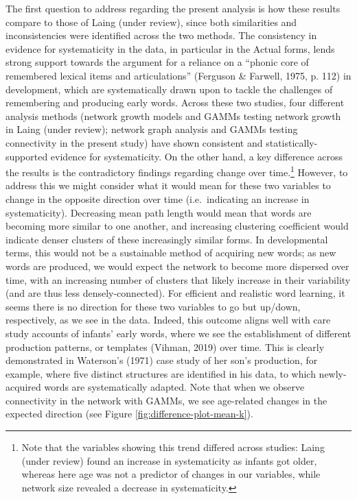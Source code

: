 \documentclass[
  man]{apa6}
\begin{document}
The first question to address regarding the present analysis is how these results compare to those of Laing (under review), since both similarities and inconsistencies were identified across the two methods. The consistency in evidence for systematicity in the data, in particular in the Actual forms, lends strong support towards the argument for a reliance on a ``phonic core of remembered lexical items and articulations'' (Ferguson \& Farwell, 1975, p. 112) in development, which are systematically drawn upon to tackle the challenges of remembering and producing early words. Across these two studies, four different analysis methods (network growth models and GAMMs testing network growth in Laing (under review); network graph analysis and GAMMs testing connectivity in the present study) have shown consistent and statistically-supported evidence for systematicity. On the other hand, a key difference across the results is the contradictory findings regarding change over time.\footnote{Note that the variables showing this trend differed across studies: Laing (under review) found an increase in systematicity as infants got older, whereas here age was not a predictor of changes in our variables, while network size revealed a decrease in systematicity.} However, to address this we might consider what it would mean for these two variables to change in the opposite direction over time (i.e.~indicating an increase in systematicity). Decreasing mean path length would mean that words are becoming more similar to one another, and increasing clustering coefficient would indicate denser clusters of these increasingly similar forms. In developmental terms, this would not be a sustainable method of acquiring new words; as new words are produced, we would expect the network to become more dispersed over time, with an increasing number of clusters that likely increase in their variability (and are thus less densely-connected). For efficient and realistic word learning, it seems there is no direction for these two variables to go but up/down, respectively, as we see in the data. Indeed, this outcome aligns well with care study accounts of infants' early words, where we see the establishment of different production patterns, or templates (Vihman, 2019) over time. This is clearly demonstrated in Waterson's (1971) case study of her son's production, for example, where five distinct structures are identified in his data, to which newly-acquired words are systematically adapted. Note that when we observe connectivity in the network with GAMMs, we see age-related changes in the expected direction (see Figure \ref{fig:difference-plot-mean-k}).
\end{document}
